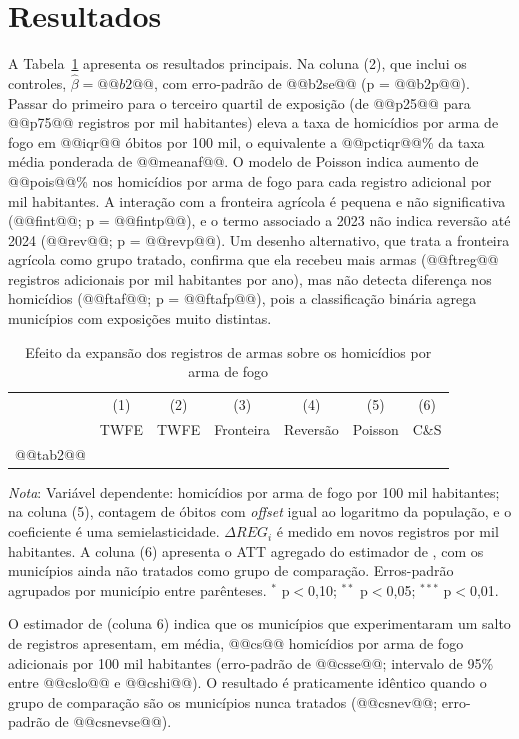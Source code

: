 \documentclass[11pt,a4paper]{article}
\newcommand{\nota}[1]{\par\vspace{2pt}\begin{minipage}{\linewidth}\footnotesize\textit{Nota}: #1\end{minipage}}
\begin{document}
\section{Resultados}\label{sec:resultados}

A Tabela~\ref{tab:main} apresenta os resultados principais. Na coluna (2), que inclui os controles, $\hat\beta = @@b2@@$, com erro-padrão de @@b2se@@ (p = @@b2p@@). Passar do primeiro para o terceiro quartil de exposição (de @@p25@@ para @@p75@@ registros por mil habitantes) eleva a taxa de homicídios por arma de fogo em @@iqr@@ óbitos por 100 mil, o equivalente a @@pctiqr@@\% da taxa média ponderada de @@meanaf@@. O modelo de Poisson indica aumento de @@pois@@\% nos homicídios por arma de fogo para cada registro adicional por mil habitantes. A interação com a fronteira agrícola é pequena e não significativa (@@fint@@; p = @@fintp@@), e o termo associado a 2023 não indica reversão até 2024 (@@rev@@; p = @@revp@@). Um desenho alternativo, que trata a fronteira agrícola como grupo tratado, confirma que ela recebeu mais armas (@@ftreg@@ registros adicionais por mil habitantes por ano), mas não detecta diferença nos homicídios (@@ftaf@@; p = @@ftafp@@), pois a classificação binária agrega municípios com exposições muito distintas.

\begin{table}[H]
\centering\footnotesize\setlength{\tabcolsep}{4pt}
\caption{Efeito da expansão dos registros de armas sobre os homicídios por arma de fogo}\label{tab:main}
\begin{tabular}{lcccccc}
\toprule
 & (1) & (2) & (3) & (4) & (5) & (6) \\
 & TWFE & TWFE & Fronteira & Reversão & Poisson & C\&S \\
\midrule
@@tab2@@
\bottomrule
\end{tabular}
\nota{Variável dependente: homicídios por arma de fogo por 100 mil habitantes; na coluna (5), contagem de óbitos com \textit{offset} igual ao logaritmo da população, e o coeficiente é uma semielasticidade. $\Delta REG_i$ é medido em novos registros por mil habitantes. A coluna (6) apresenta o ATT agregado do estimador de \citet{callaway2021}, com os municípios ainda não tratados como grupo de comparação. Erros-padrão agrupados por município entre parênteses. $^{*}$ p$<$0,10; $^{**}$ p$<$0,05; $^{***}$ p$<$0,01.}
\end{table}

O estimador de \citet{callaway2021} (coluna 6) indica que os municípios que experimentaram um salto de registros apresentam, em média, @@cs@@ homicídios por arma de fogo adicionais por 100 mil habitantes (erro-padrão de @@csse@@; intervalo de 95\% entre @@cslo@@ e @@cshi@@). O resultado é praticamente idêntico quando o grupo de comparação são os municípios nunca tratados (@@csnev@@; erro-padrão de @@csnevse@@).
\end{document}

